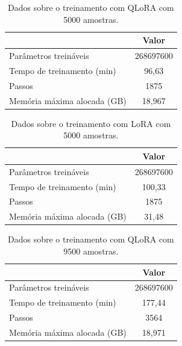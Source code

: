 \begin{table}[ht]
    \caption{\small Dados sobre o treinamento com \ac{QLoRA} com 5000 amostras.}
    \centering
    \begin{tabular}{l|c}
        \hline
                                    & Valor     \\ \hline
        Parâmetros treináveis       & 268697600 \\
        Tempo de treinamento (min)  & 96,63     \\
        Passos                      & 1875      \\
        Memória máxima alocada (GB) & 18,967    \\ \hline
    \end{tabular}
    \label{tab:qlora_5000_training}
\end{table}

\begin{table}[ht]
    \caption{\small Dados sobre o treinamento com \ac{LoRA} com 5000 amostras.}
    \centering
    \begin{tabular}{l|c}
        \hline
                                    & Valor     \\ \hline
        Parâmetros treináveis       & 268697600 \\
        Tempo de treinamento (min)  & 100,33    \\
        Passos                      & 1875      \\
        Memória máxima alocada (GB) & 31,48     \\ \hline
    \end{tabular}
    \label{tab:lora_5000_training}
\end{table}

\clearpage

\begin{table}[ht]
    \caption{\small Dados sobre o treinamento com \ac{QLoRA} com 9500 amostras.}
    \centering
    \begin{tabular}{l|c}
        \hline
                                    & Valor     \\ \hline
        Parâmetros treináveis       & 268697600 \\
        Tempo de treinamento (min)  & 177,44    \\
        Passos                      & 3564      \\
        Memória máxima alocada (GB) & 18,971    \\ \hline
    \end{tabular}
    \label{tab:qlora_9500_training}
\end{table}


